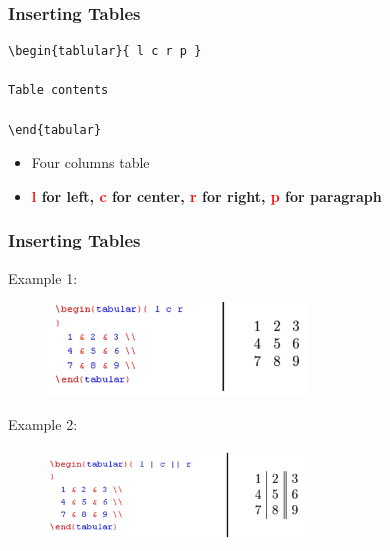 \documentclass [9pt] {beamer}
\begin{document}

\begin{frame}[fragile]\frametitle{Inserting Tables}
\rm
\fontsize{9pt}{11pt}\selectfont
{\color{red}
\begin{verbatim}
\begin{tablular}{ l c r p }

Table contents

\end{tabular}
\end{verbatim}
}
\begin{itemize}
\item Four columns table\\[.20cm]
\item {\bf \textcolor{red}{l} for left, \textcolor{red}{c} for center, \textcolor{red}{r} for right, \textcolor{red}{p} for paragraph}\\[.20cm]
\end{itemize}

\end{frame}

\begin{frame}\frametitle{Inserting Tables}
\rm
\fontsize{9pt}{11pt}\selectfont
Example 1:
\begin{figure}
\includegraphics[height=2.5cm]{tb1.png}
\end{figure}
Example 2:
\begin{figure}
\includegraphics[height=2.5cm]{tb2.png}
\end{figure}
\end{frame}
\end{document}
